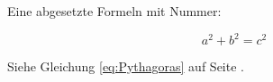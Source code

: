 \documentclass[12pt,ngerman]{scrartcl}
\begin{document}
Eine abgesetzte Formeln mit Nummer:

\begin{equation}
a^2 + b^2 = c^2 \label{eq:Pythagoras}
\end{equation}

Siehe Gleichung \ref{eq:Pythagoras} auf Seite \pageref{eq:Pythagoras}.
\end{document}
